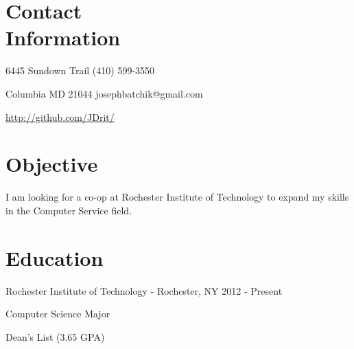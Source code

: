 \documentclass[a4paper,margin,line,11pt]{resume}
\newcommand{\rurl}[1]{\hfill {\footnotesize \url{#1}}}
\newcommand{\rdate}[1]{\hfill {\small #1}}
\begin{document}
\begin{resume}
\section{\mysidestyle Contact \\ Information} \vspace{2mm}
	\begin{asparablank}
		\item 6445 Sundown Trail \hfill (410) 599-3550
		\item Columbia MD 21044 \hfill josephbatchik@gmail.com
		\item \rurl{http://github.com/JDrit/}
	\end{asparablank}

\section{\mysidestyle Objective}
	 I am looking for a co-op at Rochester Institute of Technology to expand my skills in the Computer Service field.

\section{\mysidestyle Education}
	\begin{compactdesc}
		\item[Rochester Institute of Technology] - Rochester, NY \rdate{2012 - Present}
		\begin{compactitem} { \small
			\item Computer Science Major
			\item Dean's List (3.65 GPA)
		} \end{compactitem}
	\end{compactdesc}


\end{resume}
\end{document}
